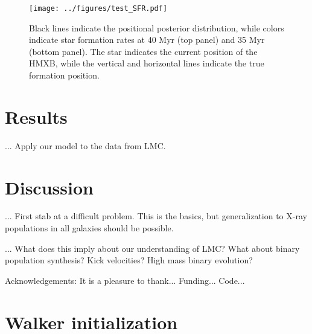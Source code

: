 \documentclass[12pt, preprint]{aastex}
\begin{document}
\begin{figure}[h!]
\begin{center}
\texttt{[image: ../figures/test\_SFR.pdf]}
\caption{Black lines indicate the positional posterior distribution, while colors indicate star formation rates at 40 Myr (top panel) and 35 Myr (bottom panel). The star indicates the current position of the HMXB, while the vertical and horizontal lines indicate the true formation position.}
\label{fig:test_SFR}
\end{center}
\end{figure}



\section{Results}

... Apply our model to the data from LMC. 

\section{Discussion}

... First stab at a difficult problem. This is the basics, but generalization to X-ray populations in all galaxies should be possible.

... What does this imply about our understanding of LMC? What about binary population synthesis? Kick velocities? High mass binary evolution?



\acknowledgements
Acknowledgements:
It is a pleasure to thank...
Funding...
Code...



\appendix

\section{Walker initialization}
\end{document}
